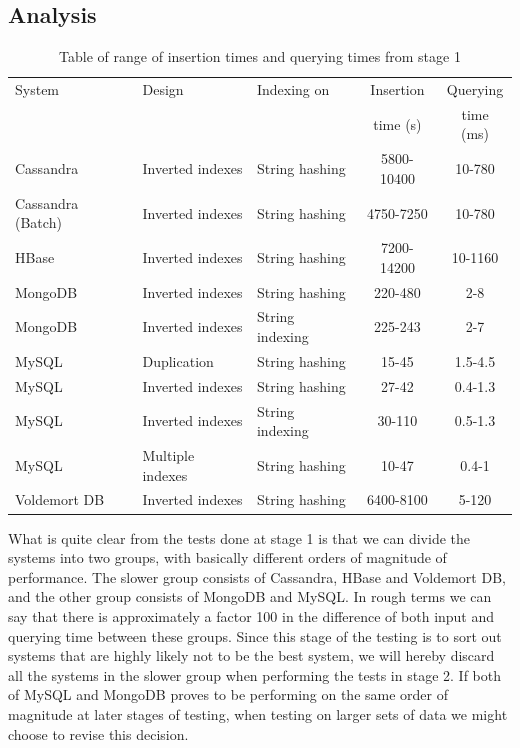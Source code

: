 \subsection{Analysis}

\begin{table}
\caption{Table of range of insertion times and querying times from stage 1}
\centering
\begin{tabular}{l|l|l|c|c}
\hline\hline
System              & Design            & Indexing on     & Insertion      &  Querying        \\
                    &                   &                 & time (s)       & time (ms)        \\
\hline
Cassandra           &  Inverted indexes & String hashing  & 5800-10400     & 10-780           \\
Cassandra (Batch)   &  Inverted indexes & String hashing  & 4750-7250      & 10-780           \\
HBase               &  Inverted indexes & String hashing  & 7200-14200     & 10-1160          \\
MongoDB             &  Inverted indexes & String hashing  & 220-480        & 2-8              \\
MongoDB             &  Inverted indexes & String indexing & 225-243        & 2-7              \\
MySQL               &  Duplication      & String hashing  & 15-45          & 1.5-4.5          \\
MySQL               &  Inverted indexes & String hashing  & 27-42          & 0.4-1.3          \\
MySQL               &  Inverted indexes & String indexing & 30-110         & 0.5-1.3          \\
MySQL               &  Multiple indexes & String hashing  & 10-47          & 0.4-1            \\
Voldemort DB        &  Inverted indexes & String hashing  & 6400-8100      & 5-120            \\
\hline
\end{tabular}
\end{table}

What is quite clear from the tests done at stage 1 is that we can divide the systems into two groups, with basically different orders of magnitude of performance. The slower group consists of Cassandra, HBase and Voldemort DB, and the other group consists of MongoDB and MySQL. In rough terms we can say that there is approximately a factor 100 in the difference of both input and querying time between these groups. Since this stage of the testing is to sort out systems that are highly likely not to be the best system, we will hereby discard all the systems in the slower group when performing the tests in stage 2. If both of MySQL and MongoDB proves to be performing on the same order of magnitude at later stages of testing, when testing on larger sets of data we might choose to revise this decision.

